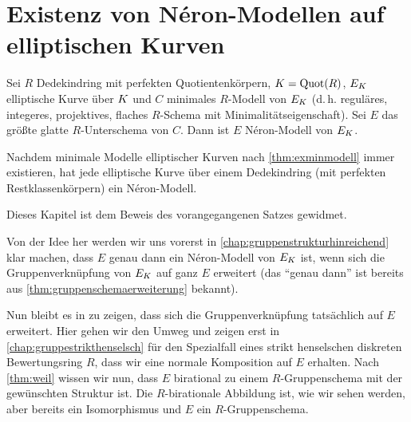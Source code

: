 \chapter{Existenz von Néron-Modellen auf elliptischen Kurven}
\label{chap:exneronmodelle}
\begin{Satz}\label{thm:exneronmodelle}

  Sei $R$ Dedekindring mit perfekten Quotientenkörpern,
  $K=\operatorname{Quot}(R)$, $E_{K}$ elliptische Kurve über $K$ und $C$ minimales
  $R$-Modell von $E_{K}$
  (d.\,h. reguläres, integeres, projektives,
  flaches $R$-Schema mit Minimalitätseigenschaft).
  Sei $E$ das größte glatte $R$-Unterschema von $C$.
  Dann ist $E$ Néron-Modell von $E_{K}$.

  Nachdem minimale Modelle elliptischer
  Kurven nach \ref{thm:exminmodell} immer existieren, hat jede
  elliptische Kurve über einem Dedekindring (mit perfekten
  Restklassenkörpern) ein Néron-Modell.
\end{Satz}
Dieses Kapitel ist dem Beweis des vorangegangenen Satzes gewidmet.

Von der Idee her werden wir uns vorerst in
\autoref{chap:gruppenstrukturhinreichend} klar machen, dass $E$ genau 
dann ein Néron-Modell von $E_{K}$ ist, wenn sich die Gruppenverknüpfung
von $E_{K}$ auf ganz $E$ erweitert (das \enquote{genau dann} ist
bereits aus \ref{thm:gruppenschemaerweiterung} bekannt).

Nun bleibt es in zu zeigen, dass sich die Gruppenverknüpfung tatsächlich
auf $E$ erweitert.
Hier gehen wir den Umweg und zeigen erst in
\autoref{chap:gruppestrikthenselsch} für den Spezialfall eines
strikt henselschen diskreten Bewertungsring $R$, dass wir eine normale
Komposition auf $E$ erhalten. Nach \ref{thm:weil} wissen wir nun, dass
$E$ birational zu einem $R$-Gruppenschema mit der gewünschten Struktur
ist. Die $R$-birationale Abbildung ist, wie wir sehen werden, aber
bereits ein Isomorphismus und $E$ ein $R$-Gruppenschema.

